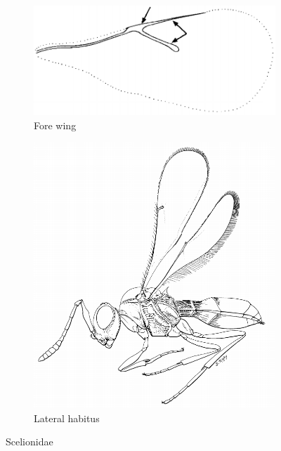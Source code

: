 \documentclass[letterpaper, 11pt]{article}
\begin{document}
\begin{figure}[ht!]
  \centering
\begin{subfigure}[ht!]{0.45\textwidth}
    \includegraphics[width=\textwidth]{ScelionidWing}
  \caption{Fore wing \citep[][pg. 560]{goulet1993hymenoptera}}
  \label{fig:scelionid1}
\end{subfigure}
    \hfill
\begin{subfigure}[ht!]{0.45\textwidth}
    \includegraphics[width=\textwidth]{ScelionidHabitus}
  \caption{Lateral habitus \citep[][Fig. 207]{goulet1993hymenoptera}}
  \label{fig:scelionid2}
\end{subfigure}
    \caption{Scelionidae}\label{fig:scelionids}
\end{figure}
\end{document}
